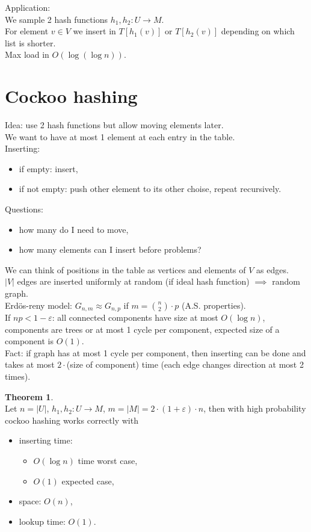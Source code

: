 \documentclass[a4paper, 12pt]{book}
\theoremstyle{definition}
\newtheorem{theorem}[counter]{Theorem}
\theoremstyle{remark}
\begin{document}
Application: \\
We sample 2 hash functions $h_1, h_2: U \to M$. \\
For element $v \in V$ we insert in $T[h_1(v)]$ or $T[h_2(v)]$ depending on which list is shorter. \\
Max load in $O(\log (\log n))$.


\section{Cockoo hashing}

Idea: use 2 hash functions but allow moving elements later. \\
We want to have at most 1 element at each entry in the table. \\
Inserting: %
\begin{itemize}
  \item if empty: insert,
  \item if not empty: push other element to its other choise, repeat recursively.
\end{itemize}
Questions:
\begin{itemize}
  \item how many do I need to move,
  \item how many elements can I insert before problems?
\end{itemize}
We can think of positions in the table as vertices and elements of $V$ as edges. \\
$|V|$ edges are inserted uniformly at random (if ideal hash function)
$\implies$ random graph. \\
Erdös-reny model: $G_{n,m} \approx G_{n,p}$ if $m = \binom{n}{2} \cdot p$ (A.S. properties). \\
If $np < 1 - \varepsilon$: all connected components have size at most $O(\log n)$,
components are trees or at most 1 cycle per component, expected size of a component is $O(1)$. \\
Fact: if graph has at most 1 cycle per component, then inserting can be done and takes at most
$2 \cdot $(size of component) time (each edge changes direction at most 2 times).
\begin{theorem} \text{} \\
  Let $n = |U|$, $h_1, h_2: U \to M$, $m = |M| = 2 \cdot (1 + \varepsilon) \cdot n$,
  then with high probability cockoo hashing works correctly with
  \begin{itemize}
    \item inserting time:
      \begin{itemize}
        \item $O(\log n)$ time worst case,
        \item $O(1)$ expected case,
      \end{itemize}
    \item space: $O(n)$,
    \item lookup time: $O(1)$.
  \end{itemize}
\end{theorem}
\end{document}
